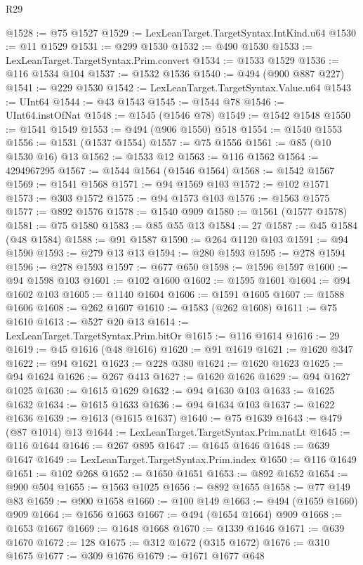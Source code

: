 \begin{lexlean}{R29}
\begin{coremodule}
@1528 := @75 @1527
@1529 := LexLeanTarget.TargetSyntax.IntKind.u64
@1530 := @11 @1529
@1531 := @299 @1530
@1532 := @490 @1530
@1533 := LexLeanTarget.TargetSyntax.Prim.convert
@1534 := @1533 @1529
@1536 := @116 @1534 @104
@1537 := @1532 @1536
@1540 := @494 (@900 @887 @227)
@1541 := @229 @1530
@1542 := LexLeanTarget.TargetSyntax.Value.u64
@1543 := UInt64
@1544 := @43 @1543
@1545 := @1544 @78
@1546 := UInt64.instOfNat
@1548 := @1545 (@1546 @78)
@1549 := @1542 @1548
@1550 := @1541 @1549
@1553 := @494 (@906 @1550) @518
@1554 := @1540 @1553
@1556 := @1531 (@1537 @1554)
@1557 := @75 @1556
@1561 := @85 (@10 @1530 @16) @13
@1562 := @1533 @12
@1563 := @116 @1562
@1564 := 4294967295
@1567 := @1544 @1564 (@1546 @1564)
@1568 := @1542 @1567
@1569 := @1541 @1568
@1571 := @94 @1569 @103
@1572 := @102 @1571
@1573 := @303 @1572
@1575 := @94 @1573 @103
@1576 := @1563 @1575
@1577 := @892 @1576
@1578 := @1540 @909
@1580 := @1561 (@1577 @1578)
@1581 := @75 @1580
@1583 := @85 @55 @13
@1584 := 27
@1587 := @45 @1584 (@48 @1584)
@1588 := @91 @1587
@1590 := @264 @1120 @103
@1591 := @94 @1590
@1593 := @279 @13 @13
@1594 := @280 @1593
@1595 := @278 @1594
@1596 := @278 @1593
@1597 := @677 @650
@1598 := @1596 @1597
@1600 := @94 @1598 @103
@1601 := @102 @1600
@1602 := @1595 @1601
@1604 := @94 @1602 @103
@1605 := @1140 @1604
@1606 := @1591 @1605
@1607 := @1588 @1606
@1608 := @262 @1607
@1610 := @1583 (@262 @1608)
@1611 := @75 @1610
@1613 := @527 @20 @13
@1614 := LexLeanTarget.TargetSyntax.Prim.bitOr
@1615 := @116 @1614
@1616 := 29
@1619 := @45 @1616 (@48 @1616)
@1620 := @91 @1619
@1621 := @1620 @347
@1622 := @94 @1621
@1623 := @228 @380
@1624 := @1620 @1623
@1625 := @94 @1624
@1626 := @267 @413
@1627 := @1620 @1626
@1629 := @94 @1627 @1025
@1630 := @1615 @1629
@1632 := @94 @1630 @103
@1633 := @1625 @1632
@1634 := @1615 @1633
@1636 := @94 @1634 @103
@1637 := @1622 @1636
@1639 := @1613 (@1615 @1637)
@1640 := @75 @1639
@1643 := @479 (@87 @1014) @13
@1644 := LexLeanTarget.TargetSyntax.Prim.natLt
@1645 := @116 @1644
@1646 := @267 @895
@1647 := @1645 @1646
@1648 := @639 @1647
@1649 := LexLeanTarget.TargetSyntax.Prim.index
@1650 := @116 @1649
@1651 := @102 @268
@1652 := @1650 @1651
@1653 := @892 @1652
@1654 := @900 @504
@1655 := @1563 @1025
@1656 := @892 @1655
@1658 := @77 @149 @83
@1659 := @900 @1658
@1660 := @100 @149
@1663 := @494 (@1659 @1660) @909
@1664 := @1656 @1663
@1667 := @494 (@1654 @1664) @909
@1668 := @1653 @1667
@1669 := @1648 @1668
@1670 := @1339 @1646
@1671 := @639 @1670
@1672 := 128
@1675 := @312 @1672 (@315 @1672)
@1676 := @310 @1675
@1677 := @309 @1676
@1679 := @1671 @1677 @648

\end{coremodule}
\end{lexlean}
